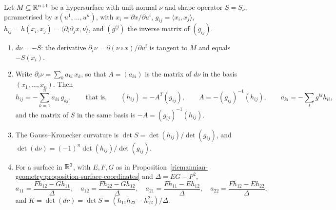 \begin{proposition}\label{riemannian-geometry:proposition-weingarten-coordinates}
Let $M \subseteq \mathbb{R}^{n+1}$ be a hypersurface with unit normal $\nu$ and shape operator $S = S_\nu$, parametrised by $x(u^1, \ldots, u^n)$, with $x_i = \partial x/\partial u^i$,
$g_{ij} = \langle x_i, x_j\rangle$, $h_{ij} = h(x_i, x_j) = \langle\partial_i\partial_jx, \nu\rangle$, and $(g^{ij})$ the inverse matrix of $(g_{ij})$.
\begin{enumerate}
\item $d\nu = -S$: the derivative $\partial_i\nu = \partial(\nu \circ x)/\partial u^i$ is tangent to $M$ and equals $-S(x_i)$.
\item Write $\partial_i\nu = \sum_ka_{ki}\,x_k$, so that $A = (a_{ki})$ is the matrix of $d\nu$ in the basis $(x_1, \ldots, x_n)$. Then
\[
h_{ij} = -\sum_{k=1}^na_{ki}\,g_{kj}, \qquad\text{that is,}\qquad (h_{ij}) = -A^T(g_{ij}), \qquad A = -(g_{ij})^{-1}(h_{ij}), \qquad a_{ki} = -\sum_lg^{kl}h_{li},
\]
and the matrix of $S$ in the same basis is $-A = (g_{ij})^{-1}(h_{ij})$.
\item The Gauss--Kronecker curvature is $\det S = \det(h_{ij})/\det(g_{ij})$, and $\det(d\nu) = (-1)^n\det(h_{ij})/\det(g_{ij})$.
\item For a surface in $\mathbb{R}^3$, with $E, F, G$ as in Proposition~\ref{riemannian-geometry:proposition-surface-coordinates} and $\Delta = EG - F^2$,
\[
a_{11} = \frac{Fh_{12} - Gh_{11}}{\Delta}, \quad a_{12} = \frac{Fh_{22} - Gh_{12}}{\Delta}, \quad a_{21} = \frac{Fh_{11} - Eh_{12}}{\Delta}, \quad
a_{22} = \frac{Fh_{12} - Eh_{22}}{\Delta},
\]
and $K = \det(d\nu) = \det S = (h_{11}h_{22} - h_{12}^2)/\Delta$.
\end{enumerate}
\end{proposition}

